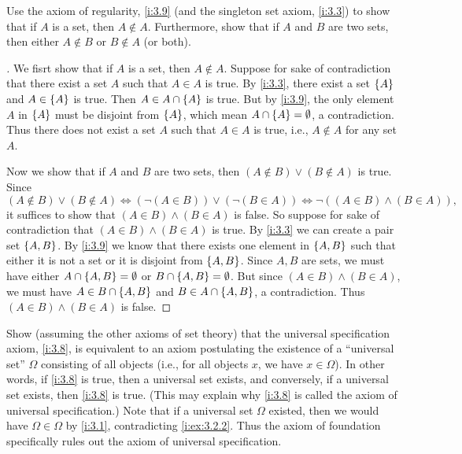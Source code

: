 \begin{ex}\label{i:ex:3.2.2}
  Use the axiom of regularity, \cref{i:3.9} (and the singleton set axiom, \cref{i:3.3}) to show that if \(A\) is a set, then \(A \notin A\).
  Furthermore, show that if \(A\) and \(B\) are two sets, then either \(A \notin B\) or \(B \notin A\) (or both).
\end{ex}

\begin{proof}[]
  We fisrt show that if \(A\) is a set, then \(A \notin A\).
  Suppose for sake of contradiction that there exist a set \(A\) such that \(A \in A\) is true.
  By \cref{i:3.3}, there exist a set \(\left\lbrace A\right\rbrace\) and \(A \in \left\lbrace A\right\rbrace\) is true.
  Then \(A \in A \cap \left\lbrace A\right\rbrace\) is true.
  But by \cref{i:3.9}, the only element \(A\) in \(\left\lbrace A\right\rbrace\) must be disjoint from \(\left\lbrace A\right\rbrace\), which mean \(A \cap \left\lbrace A\right\rbrace = \emptyset\), a contradiction.
  Thus there does not exist a set \(A\) such that \(A \in A\) is true, i.e., \(A \notin A\) for any set \(A\).

  Now we show that if \(A\) and \(B\) are two sets, then \((A \notin B) \lor (B \notin A)\) is true.
  Since
  \[
    (A \notin B) \lor (B \notin A) \iff (\lnot(A \in B)) \lor (\lnot(B \in A)) \iff \lnot ((A \in B) \land (B \in A)),
  \]
  it suffices to show that \((A \in B) \land (B \in A)\) is false.
  So suppose for sake of contradiction that \((A \in B) \land (B \in A)\) is true.
  By \cref{i:3.3} we can create a pair set \(\left\lbrace A, B\right\rbrace\).
  By \cref{i:3.9} we know that there exists one element in \(\left\lbrace A, B\right\rbrace\) such that either it is not a set or it is disjoint from \(\left\lbrace A, B\right\rbrace\).
  Since \(A, B\) are sets, we must have either \(A \cap \left\lbrace A, B\right\rbrace = \emptyset\) or \(B \cap \left\lbrace A, B\right\rbrace = \emptyset\).
  But since \((A \in B) \land (B \in A)\), we must have \(A \in B \cap \left\lbrace A, B\right\rbrace\) and \(B \in A \cap \left\lbrace A, B\right\rbrace\), a contradiction.
  Thus \((A \in B) \land (B \in A)\) is false.
\end{proof}

\begin{ex}\label{i:ex:3.2.3}
  Show (assuming the other axioms of set theory) that the universal specification axiom, \cref{i:3.8}, is equivalent to an axiom postulating the existence of a ``universal set'' \(\Omega\) consisting of all objects (i.e., for all objects \(x\), we have \(x \in \Omega\)).
  In other words, if \cref{i:3.8} is true, then a universal set exists, and conversely, if a universal set exists, then \cref{i:3.8} is true.
  (This may explain why \cref{i:3.8} is called the axiom of universal specification.)
  Note that if a universal set \(\Omega\) existed, then we would have \(\Omega \in \Omega\) by \cref{i:3.1}, contradicting \cref{i:ex:3.2.2}.
  Thus the axiom of foundation specifically rules out the axiom of universal specification.
\end{ex}

